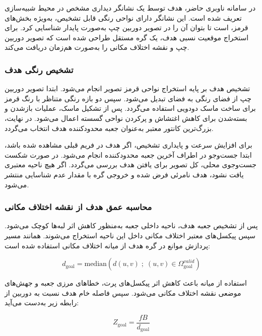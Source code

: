 در سامانه ناوبری حاضر، هدف توسط یک نشانگر دیداری مشخص در محیط شبیه‌سازی تعریف شده است. این نشانگر دارای نواحی رنگی قابل تشخیص، به‌ویژه بخش‌های قرمز، است تا بتوان آن را در تصویر دوربین چپ به‌صورت پایدار شناسایی کرد. برای استخراج موقعیت نسبی هدف، یک گره مستقل طراحی شده است که تصویر دوربین چپ و نقشه اختلاف مکانی را به‌صورت هم‌زمان دریافت می‌کند.

\subsubsection{تشخیص رنگی هدف}

تشخیص هدف بر پایه استخراج نواحی قرمز تصویر انجام می‌شود. ابتدا تصویر دوربین چپ از فضای رنگی  به فضای  تبدیل می‌شود. سپس دو بازه رنگی متناظر با رنگ قرمز برای ساخت ماسک دودویی استفاده می‌گردد. پس از تشکیل ماسک، عملیات بازشدن و بسته‌شدن برای کاهش اغتشاش و پرکردن نواحی گسسته اعمال می‌شود. در نهایت، بزرگ‌ترین کانتور معتبر به‌عنوان جعبه محدودکننده هدف انتخاب می‌گردد.

برای افزایش سرعت و پایداری تشخیص، اگر هدف در فریم قبلی مشاهده شده باشد، ابتدا جست‌وجو در اطراف آخرین جعبه محدودکننده انجام می‌شود. در صورت شکست جست‌وجوی محلی، کل تصویر برای یافتن هدف بررسی می‌گردد. اگر هیچ ناحیه معتبری یافت نشود، هدف نامرئی فرض شده و خروجی گره با مقدار عدم شناسایی منتشر می‌شود.

\subsubsection{محاسبه عمق هدف از نقشه اختلاف مکانی}

پس از تشخیص جعبه هدف، ناحیه داخلی جعبه به‌منظور کاهش اثر لبه‌ها کوچک می‌شود. سپس پیکسل‌های معتبر اختلاف مکانی داخل این ناحیه استخراج می‌شوند. همانند مسیر پردازش موانع در گره هدف از میانه اختلاف مکانی استفاده شده است:

\begin{equation}
	d_{\mathrm{goal}} =
	\mathrm{median}
	\left(
	d(u,v) \; ; \; (u,v)\in\Omega_{\mathrm{goal}}^{valid}
	\right)
	\label{eq:goal_median_disparity}
\end{equation}

استفاده از میانه باعث کاهش اثر پیکسل‌های پرت، خطاهای مرزی جعبه و جهش‌های موضعی نقشه اختلاف مکانی می‌شود. سپس فاصله خام هدف نسبت به دوربین از رابطه زیر به‌دست می‌آید:

\begin{equation}
	Z_{\mathrm{goal}} =
	\frac{fB}{d_{\mathrm{goal}}}
	\label{eq:goal_raw_depth}
\end{equation}

